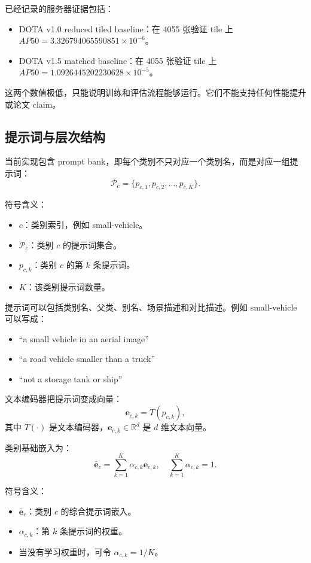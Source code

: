 \documentclass[11pt,a4paper]{ctexart}
\begin{document}
已经记录的服务器证据包括：
\begin{itemize}
  \item DOTA v1.0 reduced tiled baseline：在 4055 张验证 tile 上 $AP50=3.326794065590851\times10^{-6}$。
  \item DOTA v1.5 matched baseline：在 4055 张验证 tile 上 $AP50=1.0926445202230628\times10^{-5}$。
\end{itemize}

这两个数值极低，只能说明训练和评估流程能够运行。它们不能支持任何性能提升或论文 claim。

\subsection{提示词与层次结构}

当前实现包含 prompt bank，即每个类别不只对应一个类别名，而是对应一组提示词：
\[
\mathcal{P}_c=\{p_{c,1},p_{c,2},\ldots,p_{c,K}\}.
\]

符号含义：
\begin{itemize}
  \item $c$：类别索引，例如 small-vehicle。
  \item $\mathcal{P}_c$：类别 $c$ 的提示词集合。
  \item $p_{c,k}$：类别 $c$ 的第 $k$ 条提示词。
  \item $K$：该类别提示词数量。
\end{itemize}

提示词可以包括类别名、父类、别名、场景描述和对比描述。例如 small-vehicle 可以写成：
\begin{itemize}
  \item ``a small vehicle in an aerial image''
  \item ``a road vehicle smaller than a truck''
  \item ``not a storage tank or ship''
\end{itemize}

文本编码器把提示词变成向量：
\[
\bm e_{c,k}=T(p_{c,k}),
\]
其中 $T(\cdot)$ 是文本编码器，$\bm e_{c,k}\in\mathbb{R}^{d}$ 是 $d$ 维文本向量。

类别基础嵌入为：
\[
\bar{\bm e}_c=\sum_{k=1}^{K}\alpha_{c,k}\bm e_{c,k},
\quad
\sum_{k=1}^{K}\alpha_{c,k}=1.
\]

符号含义：
\begin{itemize}
  \item $\bar{\bm e}_c$：类别 $c$ 的综合提示词嵌入。
  \item $\alpha_{c,k}$：第 $k$ 条提示词的权重。
  \item 当没有学习权重时，可令 $\alpha_{c,k}=1/K$。
\end{itemize}
\end{document}
